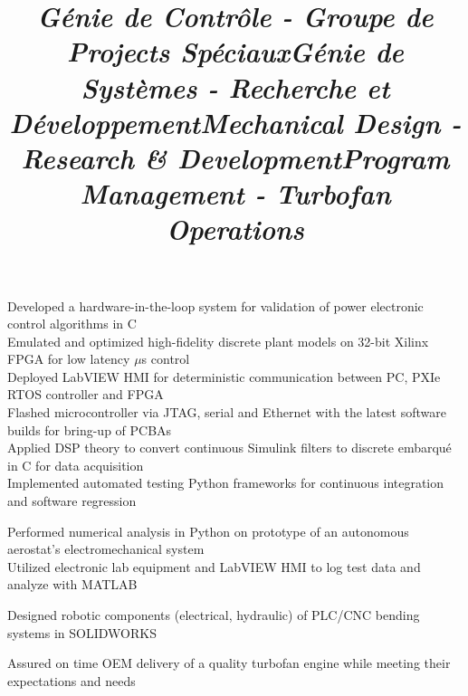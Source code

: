 \documentclass[mm]{res}
\begin{document}
\begin{resume}
\title{\textsl{G\'enie de Contr\^ole - Groupe de Projects Sp\'eciaux}}
\begin{position}
\tb Developed a hardware-in-the-loop system for validation of power electronic control algorithms in C\\
\tb Emulated and optimized high-fidelity discrete plant models on 32-bit Xilinx FPGA for low latency $\mu$s control\\
\tb Deployed LabVIEW HMI for deterministic communication between PC, PXIe RTOS controller and FPGA\\
\tb Flashed microcontroller via JTAG, serial and Ethernet with the latest software builds for bring-up of PCBAs\\
\tb Applied DSP theory to convert continuous Simulink filters to discrete embarqu\'e in C for data acquisition\\
\tb Implemented automated testing Python frameworks for continuous integration and software regression
\end{position}

\title{\textsl{G\'enie de Syst\`emes - Recherche et D\'eveloppement}}
\begin{position}
\tb Performed numerical analysis in Python on prototype of an autonomous aerostat's electromechanical system\\
\tb Utilized electronic lab equipment and LabVIEW HMI to log test data and analyze with MATLAB
\end{position}

\title{\textsl{Mechanical Design - Research \& Development}}
\begin{position}
\tb Designed robotic components (electrical, hydraulic) of PLC/CNC bending systems in SOLIDWORKS
\end{position}

\title{\textsl{Program Management - Turbofan Operations}}
\begin{position}
\tb Assured on time OEM delivery of a quality turbofan engine while meeting their expectations and needs
\end{position}


\end{resume}
\end{document}

